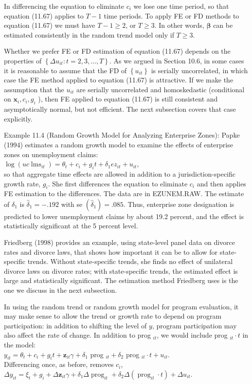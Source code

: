 \documentclass[10pt]{article}
\begin{document}
In differencing the equation to eliminate $c_{i}$ we lose one time period, so that equation (11.67) applies to $T-1$ time periods. To apply FE or FD methods to equation (11.67) we must have $T-1 \geq 2$, or $T \geq 3$. In other words, $\boldsymbol{\beta}$ can be estimated consistently in the random trend model only if $T \geq 3$.

Whether we prefer FE or FD estimation of equation (11.67) depends on the properties of $\left\{\Delta u_{i t}: t=2,3, \ldots, T\right\}$. As we argued in Section 10.6, in some cases it is reasonable to assume that the FD of $\left\{u_{i t}\right\}$ is serially uncorrelated, in which case the FE method applied to equation (11.67) is attractive. If we make the assumption that the $u_{i t}$ are serially uncorrelated and homoskedastic (conditional on $\mathbf{x}_{i}, c_{i}, g_{i}$ ), then FE applied to equation (11.67) is still consistent and asymptotically normal, but not efficient. The next subsection covers that case explicitly.

Example 11.4 (Random Growth Model for Analyzing Enterprise Zones): Papke (1994) estimates a random growth model to examine the effects of enterprise zones on unemployment claims:\\
$\log \left(u c \operatorname{lms}_{i t}\right)=\theta_{t}+c_{i}+g_{i} t+\delta_{1} e z_{i t}+u_{i t}$,\\
so that aggregate time effects are allowed in addition to a jurisdiction-specific growth rate, $g_{i}$. She first differences the equation to eliminate $c_{i}$ and then applies FE estimation to the differences. The data are in EZUNEM.RAW. The estimate of $\delta_{1}$ is $\hat{\delta}_{1}=-.192$ with se $\left(\hat{\delta}_{1}\right)=.085$. Thus, enterprise zone designation is predicted to lower unemployment claims by about 19.2 percent, and the effect is statistically significant at the 5 percent level.

Friedberg (1998) provides an example, using state-level panel data on divorce rates and divorce laws, that shows how important it can be to allow for state-specific trends. Without state-specific trends, she finds no effect of unilateral divorce laws on divorce rates; with state-specific trends, the estimated effect is large and statistically significant. The estimation method Friedberg uses is the one we discuss in the next subsection.

In using the random trend or random growth model for program evaluation, it may make sense to allow the trend or growth rate to depend on program participation: in addition to shifting the level of $y$, program participation may also affect the rate of change. In addition to prog $_{i t}$, we would include prog $_{i t} \cdot t$ in the model:\\
$y_{i t}=\theta_{t}+c_{i}+g_{i} t+\mathbf{z}_{i t} \gamma+\delta_{1}$ prog $_{i t}+\delta_{2}$ prog $_{i t} \cdot t+u_{i t}$.\\
Differencing once, as before, removes $c_{i}$,\\
$\Delta y_{i t}=\xi_{t}+g_{i}+\Delta \mathbf{z}_{i t} \gamma+\delta_{1} \Delta \operatorname{prog}_{i t}+\delta_{2} \Delta\left(\operatorname{prog}_{i t} \cdot t\right)+\Delta u_{i t}$.
\end{document}
